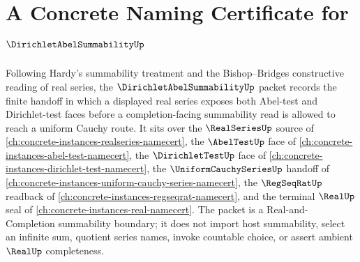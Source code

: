 \chapter{A Concrete Naming Certificate for $\DirichletAbelSummabilityUp$}
\label{ch:concrete-instances-dirichlet-abel-summability-namecert}

Following Hardy's summability treatment and the Bishop--Bridges constructive reading of real series, the $\DirichletAbelSummabilityUp$ packet records the finite handoff in which a displayed real series exposes both Abel-test and Dirichlet-test faces before a completion-facing summability read is allowed to reach a uniform Cauchy route. It sits over the $\RealSeriesUp$ source of \autoref{ch:concrete-instances-realseries-namecert}, the $\AbelTestUp$ face of \autoref{ch:concrete-instances-abel-test-namecert}, the $\DirichletTestUp$ face of \autoref{ch:concrete-instances-dirichlet-test-namecert}, the $\UniformCauchySeriesUp$ handoff of \autoref{ch:concrete-instances-uniform-cauchy-series-namecert}, the $\RegSeqRatUp$ readback of \autoref{ch:concrete-instances-regseqrat-namecert}, and the terminal $\RealUp$ seal of \autoref{ch:concrete-instances-real-namecert}. The packet is a Real-and-Completion summability boundary; it does not import host summability, select an infinite sum, quotient series names, invoke countable choice, or assert ambient $\RealUp$ completeness.

